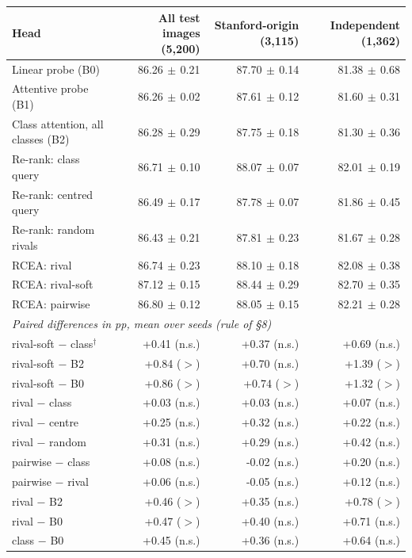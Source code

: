 \begin{tabular}{lrrr}
\toprule
Head & All test images (5,200) & Stanford-origin (3,115) & Independent (1,362) \\
\midrule
Linear probe (B0) & 86.26{\scriptsize$\,\pm\,$0.21} & 87.70{\scriptsize$\,\pm\,$0.14} & 81.38{\scriptsize$\,\pm\,$0.68} \\
Attentive probe (B1) & 86.26{\scriptsize$\,\pm\,$0.02} & 87.61{\scriptsize$\,\pm\,$0.12} & 81.60{\scriptsize$\,\pm\,$0.31} \\
Class attention, all classes (B2) & 86.28{\scriptsize$\,\pm\,$0.29} & 87.75{\scriptsize$\,\pm\,$0.18} & 81.30{\scriptsize$\,\pm\,$0.36} \\
Re-rank: class query & 86.71{\scriptsize$\,\pm\,$0.10} & 88.07{\scriptsize$\,\pm\,$0.07} & 82.01{\scriptsize$\,\pm\,$0.19} \\
Re-rank: centred query & 86.49{\scriptsize$\,\pm\,$0.17} & 87.78{\scriptsize$\,\pm\,$0.07} & 81.86{\scriptsize$\,\pm\,$0.45} \\
Re-rank: random rivals & 86.43{\scriptsize$\,\pm\,$0.21} & 87.81{\scriptsize$\,\pm\,$0.23} & 81.67{\scriptsize$\,\pm\,$0.28} \\
RCEA: rival & 86.74{\scriptsize$\,\pm\,$0.23} & 88.10{\scriptsize$\,\pm\,$0.18} & 82.08{\scriptsize$\,\pm\,$0.38} \\
RCEA: rival-soft & 87.12{\scriptsize$\,\pm\,$0.15} & 88.44{\scriptsize$\,\pm\,$0.29} & 82.70{\scriptsize$\,\pm\,$0.35} \\
RCEA: pairwise & 86.80{\scriptsize$\,\pm\,$0.12} & 88.05{\scriptsize$\,\pm\,$0.15} & 82.21{\scriptsize$\,\pm\,$0.28} \\
\midrule
\multicolumn{4}{l}{\emph{Paired differences in pp, mean over seeds (rule of \S8)}} \\
rival-soft $-$ class$^\dagger$ & +0.41 (n.s.) & +0.37 (n.s.) & +0.69 (n.s.) \\
rival-soft $-$ B2 & +0.84 ($>$) & +0.70 (n.s.) & +1.39 ($>$) \\
rival-soft $-$ B0 & +0.86 ($>$) & +0.74 ($>$) & +1.32 ($>$) \\
rival $-$ class & +0.03 (n.s.) & +0.03 (n.s.) & +0.07 (n.s.) \\
rival $-$ centre & +0.25 (n.s.) & +0.32 (n.s.) & +0.22 (n.s.) \\
rival $-$ random & +0.31 (n.s.) & +0.29 (n.s.) & +0.42 (n.s.) \\
pairwise $-$ class & +0.08 (n.s.) & -0.02 (n.s.) & +0.20 (n.s.) \\
pairwise $-$ rival & +0.06 (n.s.) & -0.05 (n.s.) & +0.12 (n.s.) \\
rival $-$ B2 & +0.46 ($>$) & +0.35 (n.s.) & +0.78 ($>$) \\
rival $-$ B0 & +0.47 ($>$) & +0.40 (n.s.) & +0.71 (n.s.) \\
class $-$ B0 & +0.45 (n.s.) & +0.36 (n.s.) & +0.64 (n.s.) \\
\bottomrule
\end{tabular}
